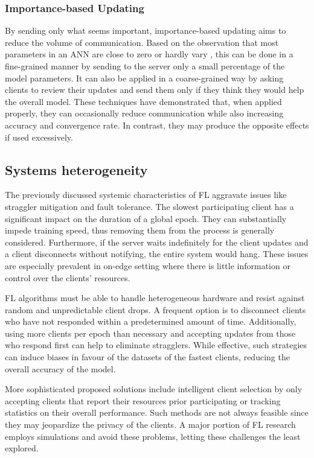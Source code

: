 \subsubsection{Importance-based Updating}
By sending only what seems important, importance-based updating aims to reduce the volume of communication. Based on the observation that most parameters in an ANN are close to zero or hardly vary \cite{observation_parameters}, this can be done in a fine-grained manner by sending to the server only a small percentage of the model parameters. It can also be applied in a coarse-grained way by asking clients to review their updates and send them only if they think they would help the overall model. These techniques have demonstrated that, when applied properly, they can occasionally reduce communication while also increasing accuracy and convergence rate. In contrast, they may produce the opposite effects if used excessively.

\subsection{Systems heterogeneity}
The previously discussed systemic characteristics of FL aggravate issues like straggler mitigation and fault tolerance. The slowest participating client has a significant impact on the duration of a global epoch. They can substantially impede training speed, thus removing them from the process is generally considered. Furthermore, if the server waits indefinitely for the client updates and a client disconnects without notifying, the entire system would hang. These issues are especially prevalent in on-edge setting where there is little information or control over the clients' resources.

FL algorithms must be able to handle heterogeneous hardware and resist against random and unpredictable client drops. A frequent option is to disconnect clients who have not responded within a predetermined amount of time. Additionally, using more clients per epoch than necessary and accepting updates from those who respond first can help to eliminate stragglers. While effective, such strategies can induce biases in favour of the datasets of the fastest clients, reducing the overall accuracy of the model.

More sophisticated proposed solutions include intelligent client selection by only accepting clients that report their resources prior participating or tracking statistics on their overall performance. Such methods are not always feasible since they may jeopardize the privacy of the clients. A major portion of FL research employs simulations and avoid these problems, letting these challenges the least explored.

